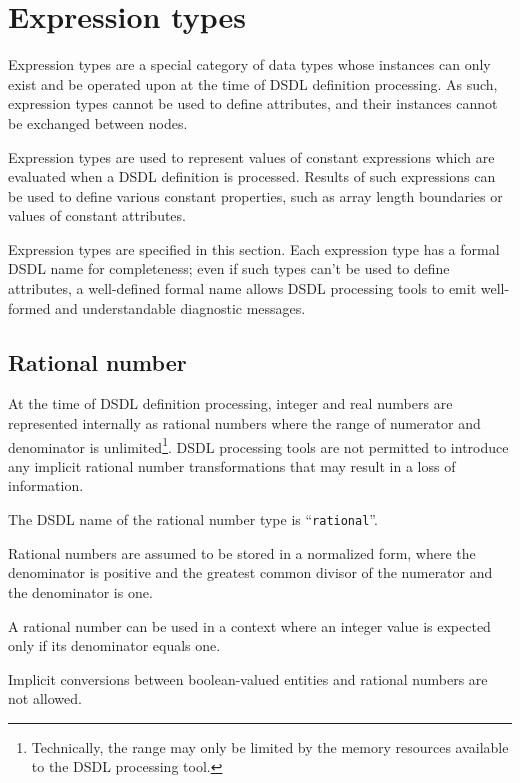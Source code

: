 
\section{Expression types}\label{sec:dsdl_expression_types}

Expression types are a special category of data types whose instances can only exist and be operated upon
at the time of DSDL definition processing.
As such, expression types cannot be used to define attributes,
and their instances cannot be exchanged between nodes.

Expression types are used to represent values of constant expressions which are evaluated
when a DSDL definition is processed.
Results of such expressions can be used to define various constant properties,
such as array length boundaries or values of constant attributes.

Expression types are specified in this section.
Each expression type has a formal DSDL name for completeness;
even if such types can't be used to define attributes,
a well-defined formal name allows DSDL processing tools to emit well-formed
and understandable diagnostic messages.

\subsection{Rational number}\label{sec:dsdl_rational}

At the time of DSDL definition processing, integer and real numbers are represented internally as rational numbers
where the range of numerator and denominator is unlimited\footnote{%
Technically, the range may only be limited by the memory resources available to the DSDL processing tool.}.
DSDL processing tools are not permitted to introduce any implicit rational number transformations that
may result in a loss of information.

The DSDL name of the rational number type is ``\verb|rational|''.

Rational numbers are assumed to be stored in a normalized form, where the denominator is positive
and the greatest common divisor of the numerator and the denominator is one.

A rational number can be used in a context where an integer value is expected only if its denominator equals one.

Implicit conversions between boolean-valued entities and rational numbers are not allowed.

